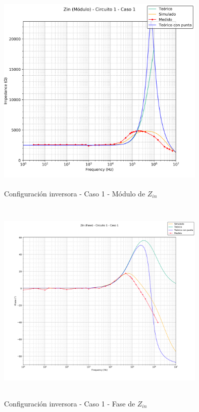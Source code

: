 \begin{figure}[H] %
	\centering
	\includegraphics[width=10cm,height=10cm,keepaspectratio]{../EJ1/00GRAFICOS/c1c1/c1c1ZINpunta.png}
	\caption{Configuración inversora - Caso 1 - M\'odulo de $Z_{in}$}
	\label{c1c1zinM}
\end{figure}

\begin{figure}[H] %
	\centering
	\includegraphics[width=10cm,height=10cm,keepaspectratio]{../EJ1/00GRAFICOS/c1c1/c1c1zinFASE.png}
	\caption{Configuración inversora - Caso 1 - Fase de $Z_{in}$ }
	\label{c1c1zinP}
\end{figure}


